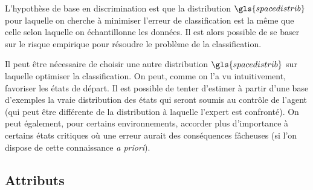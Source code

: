 \documentclass[frenchb,a4paper,justified,notoc]{tufte-book}
\newcommand{\spacedistrib}{\gls{spacedistrib}}
\begin{document}
L'hypothèse de base en discrimination est que la distribution $\spacedistrib$ pour laquelle on cherche à minimiser l'erreur de classification est la même que celle selon laquelle on échantillonne les données. Il est alors possible de se baser sur le risque empirique pour résoudre le problème de la classification.

Il peut être nécessaire de choisir une autre distribution $\spacedistrib$ sur laquelle optimiser la classification. On peut, comme on l'a vu intuitivement, favoriser les états de départ. Il est possible de tenter d'estimer à partir d'une base d'exemples la vraie distribution des états qui seront soumis au contrôle de l'agent (qui peut être différente de la distribution à laquelle l'expert est confronté). On peut également, pour certains environnements, accorder plus d'importance à certains états critiques où une erreur aurait des conséquences fâcheuses (si l'on dispose de cette connaissance \emph{a priori}).
\subsection{Attributs}
\label{sec-2-1-3}
\label{hier-attributs}
\end{document}
